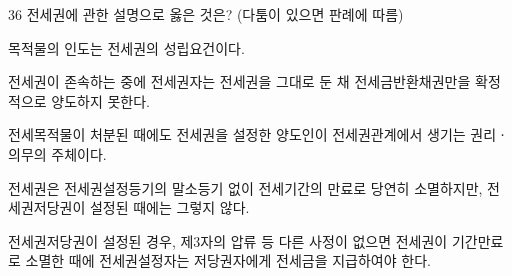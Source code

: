 \begin{question}{36}
전세권에 관한 설명으로 옳은 것은? (다툼이 있으면 판례에 따름)
\begin{choices}
  \item 목적물의 인도는 전세권의 성립요건이다.
  \item 전세권이 존속하는 중에 전세권자는 전세권을 그대로 둔 채 전세금반환채권만을 확정적으로 양도하지 못한다.
  \item 전세목적물이 처분된 때에도 전세권을 설정한 양도인이 전세권관계에서 생기는 권리ㆍ의무의 주체이다.
  \item 전세권은 전세권설정등기의 말소등기 없이 전세기간의 만료로 당연히 소멸하지만, 전세권저당권이 설정된 때에는 그렇지 않다.
  \item 전세권저당권이 설정된 경우, 제3자의 압류 등 다른 사정이 없으면 전세권이 기간만료로 소멸한 때에 전세권설정자는 저당권자에게 전세금을 지급하여야 한다.
\end{choices}
\end{question}

